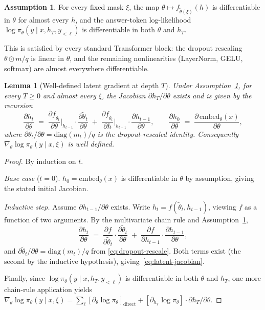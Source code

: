\documentclass[11pt]{article}
\newtheorem{lemma}[theorem]{Lemma}
\theoremstyle{definition}
\newtheorem{assumption}[theorem]{Assumption}
\theoremstyle{remark}
\begin{document}
\begin{assumption}\label{ass:smooth}
For every fixed mask $\xi$, the map $\theta \mapsto f_{\tilde\theta(\xi)}(h)$
is differentiable in $\theta$ for almost every $h$, and the answer-token
log-likelihood $\log \pi_\theta(y \mid x, h_T, y_{<\ell})$ is differentiable
in both $\theta$ and $h_T$.
\end{assumption}

This is satisfied by every standard Transformer block: the dropout rescaling
$\theta \odot m/q$ is linear in $\theta$, and the remaining nonlinearities
(LayerNorm, GELU, softmax) are almost everywhere differentiable.

\begin{lemma}[Well-defined latent gradient at depth $T$]
\label{lem:induction}
Under Assumption~\ref{ass:smooth}, for every $T \ge 0$ and almost every
$\xi$, the Jacobian $\partial h_T / \partial \theta$ exists and is given by
the recursion
\begin{equation}
\frac{\partial h_t}{\partial \theta}
  \;=\;
\frac{\partial f_{\tilde\theta_t}}{\partial \theta}\bigg|_{h_{t-1}}
  \cdot
\frac{\partial \tilde\theta_t}{\partial \theta}
  \;+\;
\frac{\partial f_{\tilde\theta_t}}{\partial h}\bigg|_{h_{t-1}}
  \cdot
\frac{\partial h_{t-1}}{\partial \theta},
\qquad
\frac{\partial h_0}{\partial \theta}
  \;=\;
\frac{\partial \,\mathrm{embed}_\theta(x)}{\partial \theta},
\label{eq:latent-jacobian}
\end{equation}
where $\partial \tilde\theta_t / \partial \theta = \mathrm{diag}(m_t)/q$ is the
dropout-rescaled identity.  Consequently
$\nabla_\theta \log \pi_\theta(y \mid x, \xi)$ is well defined.
\end{lemma}

\begin{proof}
By induction on $t$.

\emph{Base case} ($t=0$).  $h_0 = \mathrm{embed}_\theta(x)$ is differentiable in
$\theta$ by assumption, giving the stated initial Jacobian.

\emph{Inductive step.}  Assume $\partial h_{t-1}/\partial \theta$ exists.
Write $h_t = f(\tilde\theta_t, h_{t-1})$, viewing $f$ as a function of two
arguments.  By the multivariate chain rule and Assumption~\ref{ass:smooth},
\[
\frac{\partial h_t}{\partial \theta}
  \;=\;
\frac{\partial f}{\partial \tilde\theta_t}
  \cdot
\frac{\partial \tilde\theta_t}{\partial \theta}
  \;+\;
\frac{\partial f}{\partial h_{t-1}}
  \cdot
\frac{\partial h_{t-1}}{\partial \theta},
\]
and $\partial \tilde\theta_t/\partial \theta = \mathrm{diag}(m_t)/q$ from
\eqref{eq:dropout-rescale}.  Both terms exist (the second by the inductive
hypothesis), giving~\eqref{eq:latent-jacobian}.

Finally, since $\log \pi_\theta(y \mid x, h_T, y_{<\ell})$ is differentiable in
both $\theta$ and $h_T$, one more chain-rule application yields
$\nabla_\theta \log \pi_\theta(y \mid x, \xi)
   = \sum_\ell [\partial_\theta \log \pi_\theta]_{\text{direct}}
              + [\partial_{h_T}\log \pi_\theta]\cdot \partial h_T/\partial\theta$.
\end{proof}
\end{document}
